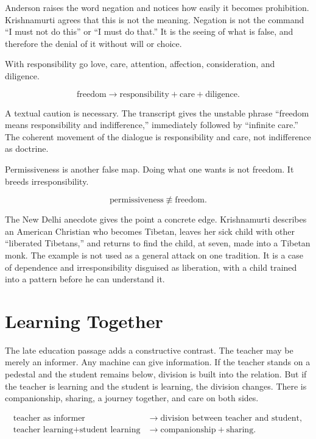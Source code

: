 \documentclass[11pt,oneside]{book}
\begin{document}
Anderson raises the word negation and notices how easily it becomes prohibition. Krishnamurti agrees that this is not the meaning. Negation is not the command ``I must not do this'' or ``I must do that.'' It is the seeing of what is false, and therefore the denial of it without will or choice.

With responsibility go love, care, attention, affection, consideration, and diligence.

\begin{equation}
\text{freedom}
\longrightarrow
\text{responsibility}+\text{care}+\text{diligence}.
\end{equation}

A textual caution is necessary. The transcript gives the unstable phrase ``freedom means responsibility and indifference,'' immediately followed by ``infinite care.'' The coherent movement of the dialogue is responsibility and care, not indifference as doctrine.

Permissiveness is another false map. Doing what one wants is not freedom. It breeds irresponsibility.

\begin{equation}
\text{permissiveness}
\not\equiv
\text{freedom}.
\end{equation}

The New Delhi anecdote gives the point a concrete edge. Krishnamurti describes an American Christian who becomes Tibetan, leaves her sick child with other ``liberated Tibetans,'' and returns to find the child, at seven, made into a Tibetan monk. The example is not used as a general attack on one tradition. It is a case of dependence and irresponsibility disguised as liberation, with a child trained into a pattern before he can understand it.

\section{Learning Together}

The late education passage adds a constructive contrast. The teacher may be merely an informer. Any machine can give information. If the teacher stands on a pedestal and the student remains below, division is built into the relation. But if the teacher is learning and the student is learning, the division changes. There is companionship, sharing, a journey together, and care on both sides.

\begin{align}
\text{teacher as informer}
&\longrightarrow
\text{division between teacher and student},\\
\text{teacher learning}+\text{student learning}
&\longrightarrow
\text{companionship}+\text{sharing}.
\end{align}
\end{document}
